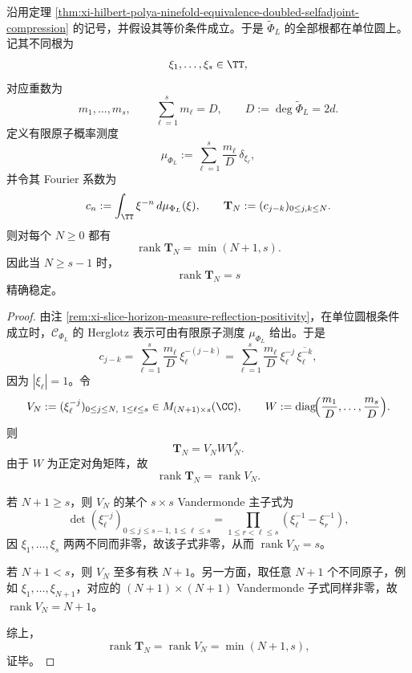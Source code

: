 \begin{theorem}\label{thm:xi-toeplitz-rank-stabilizes-to-distinct-unitcircle-roots}
沿用定理 \ref{thm:xi-hilbert-polya-ninefold-equivalence-doubled-selfadjoint-compression} 的记号，并假设其等价条件成立。于是 \(\widetilde\Phi_L\) 的全部根都在单位圆上。记其不同根为
\[
\xi_1,\dots,\xi_s\in\TT,
\]
对应重数为
\[
m_1,\dots,m_s,
\qquad
\sum_{\ell=1}^{s}m_\ell=D,
\qquad
D:=\deg\widetilde\Phi_L=2d.
\]
定义有限原子概率测度
\[
\mu_{\Phi_L}
:=
\sum_{\ell=1}^{s}\frac{m_\ell}{D}\,\delta_{\xi_\ell},
\]
并令其 Fourier 系数为
\[
c_n:=\int_{\TT}\xi^{-n}\,d\mu_{\Phi_L}(\xi),
\qquad
\mathbf{T}_N:=(c_{j-k})_{0\le j,k\le N}.
\]
则对每个 \(N\ge 0\) 都有
\[
\operatorname{rank}\mathbf{T}_N=\min(N+1,s).
\]
因此当 \(N\ge s-1\) 时，
\[
\operatorname{rank}\mathbf{T}_N=s
\]
精确稳定。
\end{theorem}
\begin{proof}
由注 \ref{rem:xi-slice-horizon-measure-reflection-positivity}，在单位圆根条件成立时，\(\mathscr{C}_{\Phi_L}\) 的 Herglotz 表示可由有限原子测度 \(\mu_{\Phi_L}\) 给出。于是
\[
c_{j-k}
=
\sum_{\ell=1}^{s}\frac{m_\ell}{D}\,\xi_\ell^{-(j-k)}
=
\sum_{\ell=1}^{s}\frac{m_\ell}{D}\,\xi_\ell^{-j}\,\overline{\xi_\ell^{-k}},
\]
因为 \(|\xi_\ell|=1\)。令
\[
V_N:=(\xi_\ell^{-j})_{0\le j\le N,\ 1\le \ell\le s}\in M_{(N+1)\times s}(\CC),
\qquad
W:=\operatorname{diag}\!\Bigl(\frac{m_1}{D},\dots,\frac{m_s}{D}\Bigr).
\]
则
\[
\mathbf{T}_N=V_N W V_N^\ast.
\]
由于 \(W\) 为正定对角矩阵，故
\[
\operatorname{rank}\mathbf{T}_N=\operatorname{rank}V_N.
\]

若 \(N+1\ge s\)，则 \(V_N\) 的某个 \(s\times s\) Vandermonde 主子式为
\[
\det(\xi_\ell^{-j})_{0\le j\le s-1,\ 1\le \ell\le s}
=
\prod_{1\le r<\ell\le s}(\xi_\ell^{-1}-\xi_r^{-1}),
\]
因 \(\xi_1,\dots,\xi_s\) 两两不同而非零，故该子式非零，从而 \(\operatorname{rank}V_N=s\)。

若 \(N+1<s\)，则 \(V_N\) 至多有秩 \(N+1\)。另一方面，取任意 \(N+1\) 个不同原子，例如 \(\xi_1,\dots,\xi_{N+1}\)，对应的 \((N+1)\times(N+1)\) Vandermonde 子式同样非零，故 \(\operatorname{rank}V_N=N+1\)。

综上，
\[
\operatorname{rank}\mathbf{T}_N=\operatorname{rank}V_N=\min(N+1,s),
\]
证毕。
\end{proof}

